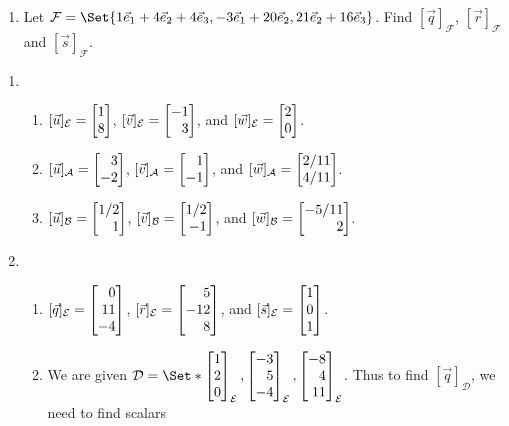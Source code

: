 \begin{exercises}
\begin{problist}
\begin{enumerate}
\begin{enumerate}
					\item Let $\mathcal F=\Set{1\xhat+4\yhat+4\zhat,-3\xhat+20\yhat,21\yhat+16\zhat}$.
						Find $[\vec q]_{\mathcal F}$, $[\vec
						r]_{\mathcal F}$ and $[\vec s]_{\mathcal
						F}$.
				\end{enumerate}
		\end{enumerate}
		\begin{solution}
			\begin{enumerate}
				\item 
					\begin{enumerate}
						\item $[\vec{u}]_{\mathcal{E}} = \mat{1\\8}$,
							$[\vec{v}]_{\mathcal{E}} = \mat{-1\\3}$, and
							$[\vec{w}]_{\mathcal{E}} = \mat{2\\0}$.
						\item $[\vec{u}]_{\mathcal{A}} = \mat{3\\-2}$,
							$[\vec{v}]_{\mathcal{A}} = \mat{1\\-1}$, and
							$[\vec{w}]_{\mathcal{A}} = \mat{2/11\\4/11}$.
						\item $[\vec{u}]_{\mathcal{B}} = \mat{1/2\\1}$,
							$[\vec{v}]_{\mathcal{B}} = \mat{1/2\\-1}$, and
							$[\vec{w}]_{\mathcal{B}} = \mat{-5/11\\2}$.
					\end{enumerate}
				\item
					\begin{enumerate}
						\item $[\vec{q}]_{\mathcal{E}} = \mat{0\\11\\-4}$,
							$[\vec{r}]_{\mathcal{E}} = \mat{5\\-12 \\8}$, and
							$[\vec{s}]_{\mathcal{E}} = \mat{1\\0\\1}$.
						\item We are given $\mathcal{D} = \Set*{ \mat{1\\2\\0}_{\mathcal{E}}, \mat{-3\\5\\-4}_{\mathcal{E}}, 
							\mat{-8\\4\\11}_{\mathcal{E}}}$. 
							Thus to find $[\vec{q}]_{\mathcal{D}}$, we need to find scalars 

\end{enumerate}
\end{enumerate}
\end{solution}
\end{problist}
\end{exercises}
